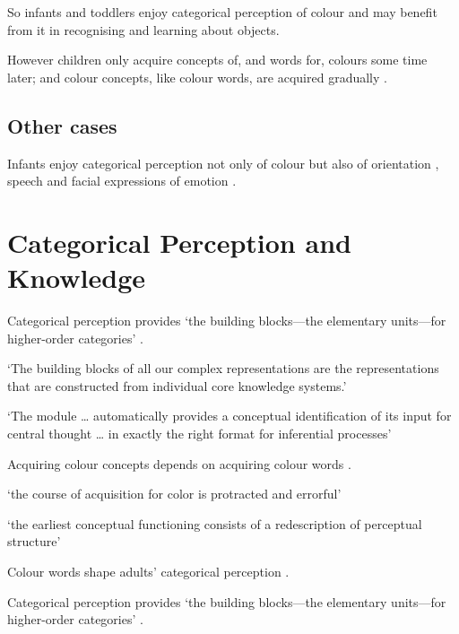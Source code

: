 \documentclass[12pt]{extarticle}
\begin{document}
\begin{multicols}{3}
So infants and toddlers enjoy categorical perception of colour and may benefit from it in recognising and learning about objects.
 
However children only acquire concepts of, and words for, colours some time later; and colour concepts, like colour words, are acquired gradually \citep{Pitchford:2005hm,Kowalski:2006hk,Sandhofer:1999if,Sandhofer:2006qo}.
 
\subsection{Other cases}
 
Infants enjoy categorical perception not only of colour but also of orientation \citep{franklin:2010_hemispheric}, speech \citep{Kuhl:1987la,Kuhl:2004nv,Jusczyk:1995it} and facial expressions of emotion \citep{Etcoff:1992zd,Kotsoni:2001ph,Campanella:2002aa}.
 
 
 
\section{Categorical Perception and Knowledge}
 
Categorical perception provides ‘the building blocks—the elementary units—for higher-order categories’
\citep[p.\ 3]{Harnad:1987ej}.
 
‘The building blocks of all our complex representations are the representations that are constructed from individual core knowledge systems.’
\citep[p.\ 307]{Spelke:2003fc}
 
‘The module … automatically provides a conceptual identification of its input for central thought … in exactly the right format for inferential processes’
\citep[pp.\ 193--4]{Leslie:1988ct}
 
Acquiring colour concepts depends on acquiring colour words
\citep{Kowalski:2006hk}.
 
‘the course of acquisition for color is protracted and errorful’
\citep{Sandhofer:2006qo}
 
‘the earliest conceptual functioning consists of a redescription of perceptual structure’
\citep{Mandler:1992vn}
 
Colour words shape adults’ categorical perception \citep{Roberson:2007wg,Winawer:2007im}.
 
Categorical perception provides ‘the building blocks—the elementary units—for higher-order categories’
\citep[p.\ 3]{Harnad:1987ej}.
 

\end{multicols}
\end{document}
